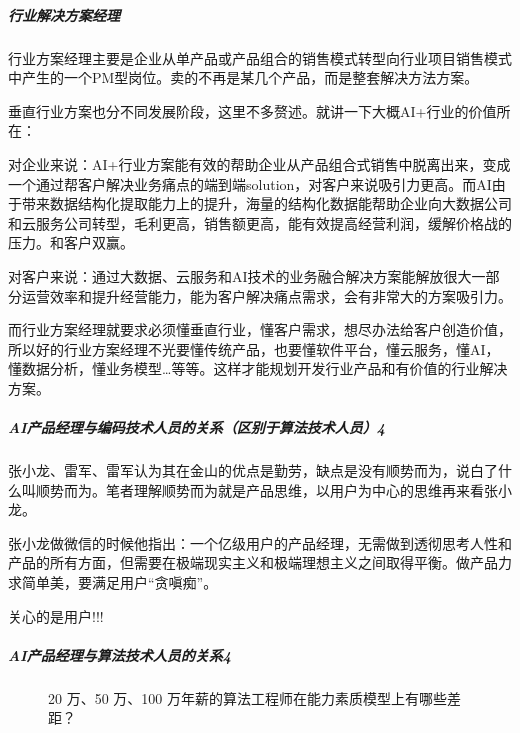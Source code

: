 \documentclass[letterpaper,11pt,english]{sphinxmanual}
\begin{document}
\subparagraph{行业解决方案经理}
\label{\detokenize{chapter_introduction/AI_PM:id16}}
行业方案经理主要是企业从单产品或产品组合的销售模式转型向行业项目销售模式中产生的一个PM型岗位。卖的不再是某几个产品，而是整套解决方法方案。

垂直行业方案也分不同发展阶段，这里不多赘述。就讲一下大概AI+行业的价值所在：

对企业来说：AI+行业方案能有效的帮助企业从产品组合式销售中脱离出来，变成一个通过帮客户解决业务痛点的端到端solution，对客户来说吸引力更高。而AI由于带来数据结构化提取能力上的提升，海量的结构化数据能帮助企业向大数据公司和云服务公司转型，毛利更高，销售额更高，能有效提高经营利润，缓解价格战的压力。和客户双赢。

对客户来说：通过大数据、云服务和AI技术的业务融合解决方案能解放很大一部分运营效率和提升经营能力，能为客户解决痛点需求，会有非常大的方案吸引力。

而行业方案经理就要求必须懂垂直行业，懂客户需求，想尽办法给客户创造价值，所以好的行业方案经理不光要懂传统产品，也要懂软件平台，懂云服务，懂AI，懂数据分析，懂业务模型…等等。这样才能规划开发行业产品和有价值的行业解决方案。


\subparagraph{AI产品经理与编码技术人员的关系（区别于算法技术人员）4\sphinxfootnotemark[241]}
\label{\detokenize{chapter_introduction/AI_PM:ai-4}}%
\begin{footnotetext}[241]\sphinxAtStartFootnote
{}
%
\end{footnotetext}\ignorespaces 
张小龙、雷军、雷军认为其在金山的优点是勤劳，缺点是没有顺势而为，说白了什么叫顺势而为。笔者理解顺势而为就是产品思维，以用户为中心的思维再来看张小龙。

张小龙做微信的时候他指出：一个亿级用户的产品经理，无需做到透彻思考人性和产品的所有方面，但需要在极端现实主义和极端理想主义之间取得平衡。做产品力求简单美，要满足用户“贪嗔痴”。

关心的是用户!!!


\subparagraph{AI产品经理与算法技术人员的关系4\sphinxfootnotemark[242]}
\label{\detokenize{chapter_introduction/AI_PM:ai4}}%
\begin{footnotetext}[242]\sphinxAtStartFootnote
{}
%
\end{footnotetext}\ignorespaces 
\begin{figure}[H]
\centering
\capstart

\noindent{}
\caption{20 万、50 万、100 万年薪的算法工程师在能力素质模型上有哪些差距？}\label{\detokenize{chapter_introduction/AI_PM:id58}}\end{figure}
\end{document}
